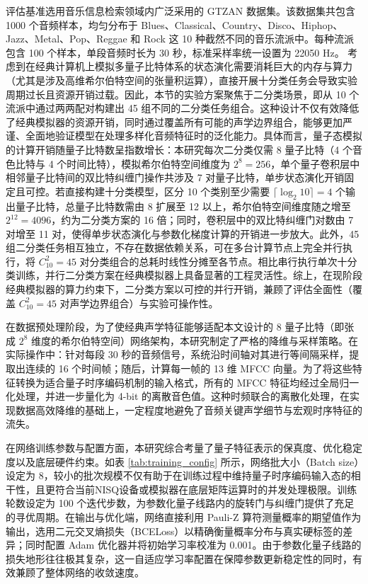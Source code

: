 评估基准选用音乐信息检索领域内广泛采用的 GTZAN 数据集。该数据集共包含 1000 个音频样本，均匀分布于 Blues、Classical、Country、Disco、Hiphop、Jazz、Metal、Pop、Reggae 和 Rock 这 10 种截然不同的音乐流派中。每种流派包含 100 个样本，单段音频时长为 30 秒，标准采样率统一设置为 22050 Hz。
考虑到在经典计算机上模拟多量子比特体系的状态演化需要消耗巨大的内存与算力（尤其是涉及高维希尔伯特空间的张量积运算），直接开展十分类任务会导致实验周期过长且资源开销过载。因此，本节的实验方案聚焦于二分类场景，即从 10 个流派中通过两两配对构建出 45 组不同的二分类任务组合。这种设计不仅有效降低了经典模拟器的资源开销，同时通过覆盖所有可能的声学边界组合，能够更加严谨、全面地验证模型在处理多样化音频特征时的泛化能力。具体而言，量子态模拟的计算开销随量子比特数呈指数增长：本研究每次二分类仅需 8 量子比特（4 个音色比特与 4 个时间比特），模拟希尔伯特空间维度为 $2^8 = 256$，单个量子卷积层中相邻量子比特间的双比特纠缠门操作共涉及 7 对量子比特，单步状态演化开销固定且可控。若直接构建十分类模型，区分 10 个类别至少需要 $\lceil\log_2 10\rceil = 4$ 个输出量子比特，总量子比特数需由 8 扩展至 12 以上，希尔伯特空间维度随之增至 $2^{12} = 4096$，约为二分类方案的 16 倍；同时，卷积层中的双比特纠缠门对数由 7 对增至 11 对，使得单步状态演化与参数化梯度计算的开销进一步放大。此外，45 组二分类任务相互独立，不存在数据依赖关系，可在多台计算节点上完全并行执行，将 $C_{10}^2 = 45$ 对分类组合的总耗时线性分摊至各节点。相比串行执行单次十分类训练，并行二分类方案在经典模拟器上具备显著的工程灵活性。综上，在现阶段经典模拟器的算力约束下，二分类方案以可控的并行开销，兼顾了评估全面性（覆盖 $C_{10}^2 = 45$ 对声学边界组合）与实验可操作性。

在数据预处理阶段，为了使经典声学特征能够适配本文设计的 8 量子比特（即张成 $2^8$ 维度的希尔伯特空间）网络架构，本研究制定了严格的降维与采样策略。在实际操作中：针对每段 30 秒的音频信号，系统沿时间轴对其进行等间隔采样，提取出连续的 16 个时间帧；随后，计算每一帧的 13 维 MFCC 向量。为了将这些特征转换为适合量子时序编码机制的输入格式，所有的 MFCC 特征均经过全局归一化处理，并进一步量化为 4-bit 的离散音色值。这种时频联合的离散化处理，在实现数据高效降维的基础上，一定程度地避免了音频关键声学细节与宏观时序特征的流失。

在网络训练参数与配置方面，本研究综合考量了量子特征表示的保真度、优化稳定度以及底层硬件约束。如表 \ref{tab:training_config} 所示，网络批大小（Batch size）设定为 8，较小的批次规模不仅有助于在训练过程中维持量子时序编码输入态的相干性，且更符合当前NISQ设备或模拟器在底层矩阵运算时的并发处理极限。训练轮数设定为 100 个迭代步数，为参数化量子线路内的旋转门与纠缠门提供了充足的寻优周期。在输出与优化端，网络直接利用 Pauli-Z 算符测量概率的期望值作为输出，选用二元交叉熵损失（BCELoss）以精确衡量概率分布与真实硬标签的差异；同时配置 Adam 优化器并将初始学习率校准为 0.001。由于参数化量子线路的损失地形往往极其复杂，这一自适应学习率配置在保障参数更新稳定性的同时，有效兼顾了整体网络的收敛速度。

